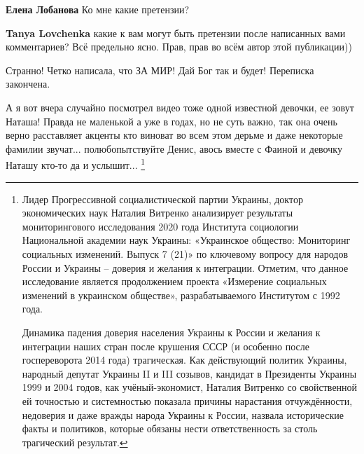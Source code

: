 \begin{itemize}
\begin{itemize}
\textbf{Елена Лобанова} Ко мне какие претензии?

 
\textbf{Tanya Lovchenka} какие к вам могут быть претензии после написанных вами комментариев? Всё предельно ясно. Прав, прав во всём автор этой публикации))

 
Странно! Четко написала, что ЗА МИР! Дай Бог так и будет! Переписка закончена.

\end{itemize}

 

А я вот вчера случайно посмотрел видео тоже одной известной девочки, ее зовут
Наташа! Правда не маленькой а уже в годах, но не суть важно, так она очень
верно расставляет акценты кто виноват во всем этом дерьме и даже некоторые
фамилии звучат... полюбопытствуйте Денис, авось вместе с Фаиной и девочку
Наташу кто-то да и услышит... \footnote{
Лидер Прогрессивной социалистической партии Украины, доктор экономических наук
Наталия Витренко анализирует результаты мониторингового исследования 2020 года
Института социологии Национальной академии наук Украины: «Украинское общество:
Мониторинг социальных изменений. Выпуск 7 (21)» по ключевому вопросу для
народов России и Украины – доверия и желания к интеграции. Отметим, что данное
исследование является продолжением проекта «Измерение социальных изменений в
украинском обществе», разрабатываемого Институтом с 1992 года.

Динамика падения доверия населения Украины к России и желания к интеграции
наших стран после крушения СССР (и особенно после госпереворота 2014 года)
трагическая. Как действующий политик Украины, народный депутат Украины II и III
созывов, кандидат в Президенты Украины 1999 и 2004 годов, как учёный-экономист,
Наталия Витренко со свойственной ей точностью и системностью показала причины
нарастания отчуждённости, недоверия и даже вражды народа Украины к России,
назвала исторические факты и политиков, которые обязаны нести ответственность
за столь трагический результат.

}
\end{itemize}

